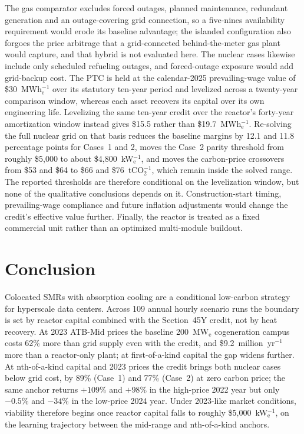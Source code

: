 \documentclass[a4paper,fleqn]{cas-sc}
\begin{document}
The gas comparator excludes forced outages, planned maintenance, redundant generation and an outage-covering grid connection, so a five-nines availability requirement would erode its baseline advantage; the islanded configuration also forgoes the price arbitrage that a grid-connected behind-the-meter gas plant would capture, and that hybrid is not evaluated here. The nuclear cases likewise include only scheduled refueling outages, and forced-outage exposure would add grid-backup cost. The PTC is held at the calendar-2025 prevailing-wage value of \$30~MWh$_\mathrm{e}^{-1}$ over its statutory ten-year period and levelized across a twenty-year comparison window, whereas each asset recovers its capital over its own engineering life. Levelizing the same ten-year credit over the reactor's forty-year amortization window instead gives \$15.5 rather than \$19.7~MWh$_\mathrm{e}^{-1}$. Re-solving the full nuclear grid on that basis reduces the baseline margins by 12.1 and 11.8 percentage points for Cases~1 and 2, moves the Case~2 parity threshold from roughly \$5{,}000 to about \$4{,}800~kW$_\mathrm{e}^{-1}$, and moves the carbon-price crossovers from \$53 and \$64 to \$66 and \$76~tCO$_2^{-1}$, which remain inside the solved range. The reported thresholds are therefore conditional on the levelization window, but none of the qualitative conclusions depends on it. Construction-start timing, prevailing-wage compliance and future inflation adjustments would change the credit's effective value further. Finally, the reactor is treated as a fixed commercial unit rather than an optimized multi-module buildout.

\section{Conclusion}
\label{sec:conclusion}

Colocated SMRs with absorption cooling are a conditional low-carbon strategy for hyperscale data centers. Across 109 annual hourly scenario runs the boundary is set by reactor capital combined with the Section~45Y credit, not by heat recovery. At 2023 ATB-Mid prices the baseline 200~MW$_\mathrm{e}$ cogeneration campus costs 62\% more than grid supply even with the credit, and \$9.2~million~yr$^{-1}$ more than a reactor-only plant; at first-of-a-kind capital the gap widens further. At nth-of-a-kind capital and 2023 prices the credit brings both nuclear cases below grid cost, by 89\% (Case~1) and 77\% (Case~2) at zero carbon price; the same anchor returns $+109\%$ and $+98\%$ in the high-price 2022 year but only $-0.5\%$ and $-34\%$ in the low-price 2024 year. Under 2023-like market conditions, viability therefore begins once reactor capital falls to roughly \$5{,}000~kW$_\mathrm{e}^{-1}$, on the learning trajectory between the mid-range and nth-of-a-kind anchors.
\end{document}
